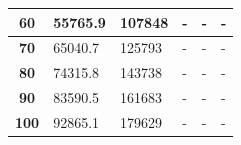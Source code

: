 \begin{table}[H]
\begin{tabular}{|c|l|l|l|l|l|}
\textbf{60}                                                                         & 55765.9                              & 107848                                & -                                     & -                                     & -                                     \\ \hline
\textbf{70}                                                                         & 65040.7                              & 125793                                & -                                     & -                                     & -                                     \\ \hline
\textbf{80}                                                                         & 74315.8                              & 143738                                & -                                     & -                                     & -                                     \\ \hline
\textbf{90}                                                                         & 83590.5                              & 161683                                & -                                     & -                                     & -                                     \\ \hline
\textbf{100}                                                                        & 92865.1                              & 179629                                & -                                     & -                                     & -                                     \\ \hline
\end{tabular}
\end{table}


